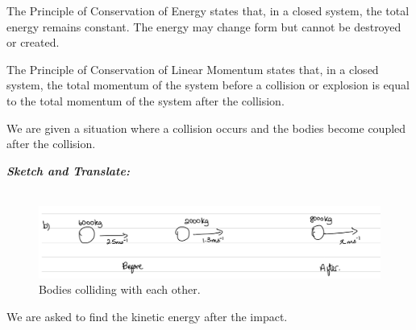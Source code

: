 %
%
%


\begin{subquestions}

\subquestion

\begin{subsubquestions}
	
\subsubquestion

The Principle of Conservation of Energy states that, in a closed system, the total energy remains constant. The energy may change form but cannot be destroyed or created. 

\subsubquestion

The Principle of Conservation of Linear Momentum states that, in a closed system, the total momentum of the system before a collision or explosion is equal to the total momentum of the system after the collision. 

\end{subsubquestions}


\begin{subsubquestions}
	
\subsubquestion

We are given a situation where a collision occurs and the bodies become coupled after the collision.

\textbf{\textit{Sketch and Translate:}} \\ \\
\begin{figure}[H]
	\begin{center}
		\includegraphics[scale=0.25]{../2008/figures/2008Jq5-1}
		\caption{\label{2008J:q5:Sketch1} Bodies colliding with each other.}
	\end{center}
\end{figure}	
We are asked to find the kinetic energy after the impact. 




\end{subsubquestions}
\end{subquestions}
